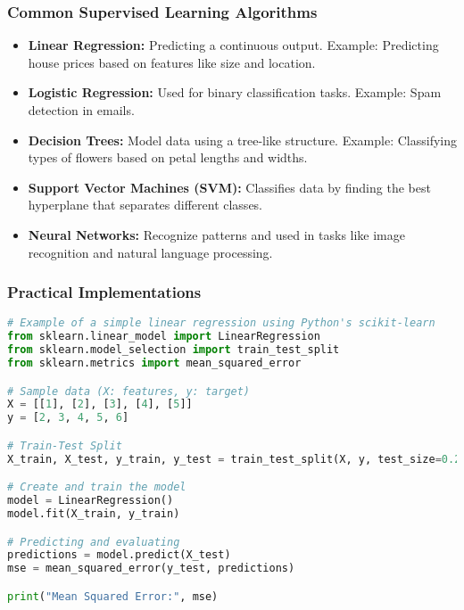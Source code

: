 \documentclass{beamer}
\begin{document}
\begin{frame}[fragile]
    \frametitle{Common Supervised Learning Algorithms}
    \begin{itemize}
        \item \textbf{Linear Regression:} Predicting a continuous output. Example: Predicting house prices based on features like size and location.
        \item \textbf{Logistic Regression:} Used for binary classification tasks. Example: Spam detection in emails.
        \item \textbf{Decision Trees:} Model data using a tree-like structure. Example: Classifying types of flowers based on petal lengths and widths.
        \item \textbf{Support Vector Machines (SVM):} Classifies data by finding the best hyperplane that separates different classes.
        \item \textbf{Neural Networks:} Recognize patterns and used in tasks like image recognition and natural language processing.
    \end{itemize}
\end{frame}

\begin{frame}[fragile]
    \frametitle{Practical Implementations}
    \begin{lstlisting}[language=Python]
# Example of a simple linear regression using Python's scikit-learn
from sklearn.linear_model import LinearRegression
from sklearn.model_selection import train_test_split
from sklearn.metrics import mean_squared_error

# Sample data (X: features, y: target)
X = [[1], [2], [3], [4], [5]]
y = [2, 3, 4, 5, 6]

# Train-Test Split
X_train, X_test, y_train, y_test = train_test_split(X, y, test_size=0.2, random_state=42)

# Create and train the model
model = LinearRegression()
model.fit(X_train, y_train)

# Predicting and evaluating
predictions = model.predict(X_test)
mse = mean_squared_error(y_test, predictions)

print("Mean Squared Error:", mse)
    \end{lstlisting}
\end{frame}
\end{document}
